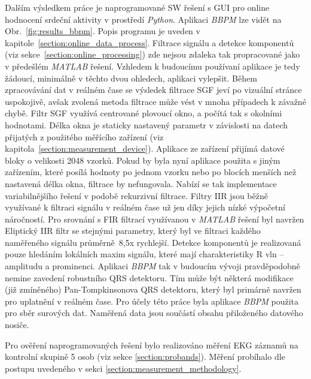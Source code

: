 Dalším výsledkem práce je naprogramované SW řešení s GUI pro online hodnocení
srdeční aktivity v prostředí \textit{Python}. Aplikaci \textit{BBPM} lze vidět
na Obr.~\ref{fig:results_bbpm}. Popis programu je uveden v
kapitole~\ref{section:online_data_process}. Filtrace signálu a detekce
komponentů (viz sekce~\ref{section:online_processing}) zde nejsou zdaleka tak
propracované jako v předešlém \textit{MATLAB} řešení. Vzhledem k budoucímu
používaní aplikace je tedy žádoucí, minimálně v těchto dvou ohledech, aplikaci
vylepšit. Během zpracovávání dat v reálném čase se výsledek filtrace SGF jeví po
vizuální stránce uspokojivě, avšak zvolená metoda filtrace může vést v mnoha
případech k závažné chybě. Filtr SGF využívá centrované plovoucí okno, a počítá
tak s okolními hodnotami. Délka okna je staticky nastavený parametr v závislosti
na datech přijatých z použitého měřícího zařízení (viz
kapitola~\ref{section:measurement_device}). Aplikace ze zařízení přijímá datové
bloky o velikosti 2048 vzorků. Pokud by byla nyní aplikace použita s jiným
zařízením, které posílá hodnoty po jednom vzorku nebo po blocích menších než
nastavená délka okna, filtrace by nefungovala. Nabízí se tak implementace
variabilnějšího řešení v podobě rekurzivní filtrace. Filtry IIR jsou běžně
využívané k filtraci signálu v reálném čase už jen díky jejich nízké výpočetní
náročností. Pro srovnání s FIR filtrací využívanou v \textit{MATLAB} řešení byl
navržen Eliptický IIR filtr se stejnými parametry, který byl ve filtraci každého
naměřeného signálu průměrně~8,5x rychlejší. Detekce komponentů je realizovaná
pouze hledáním lokálních maxim signálu, které mají charakteristiky R vln --
amplitudu a prominenci. Aplikaci \textit{BBPM} tak v budoucím vývoji
pravděpodobně nemine zavedení robustního QRS detektoru. Tím může být některá
modifikace (již zmíněného) Pan-Tompkinsonova QRS detektoru, který byl primárně
navržen pro uplatnění v reálném čase. Pro účely této práce byla aplikace
\textit{BBPM} použita pro sběr surových dat. Naměřená data jsou součástí obsahu
přiloženého datového nosiče. 

Pro ověření naprogramovaných řešení bylo realizováno měření EKG záznamů na
kontrolní skupině 5 osob (viz sekce \ref{section:probands}). Měření probíhalo
dle postupu uvedeného v sekci \ref{section:measurement_methodology}. 



















